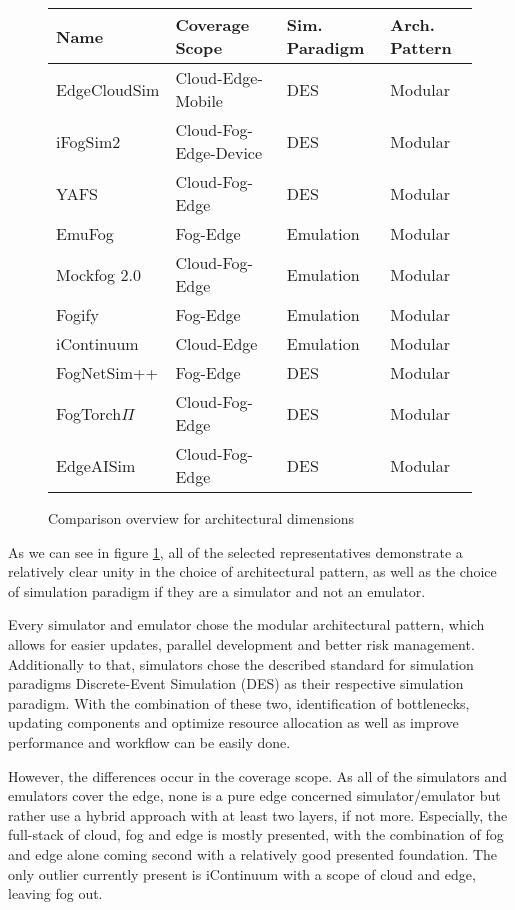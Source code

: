 \begin{figure}[H]
  \centering
  \begin{tabularx}{\textwidth}{ l | l | l | l }
    \hline
    \textbf{Name} & \textbf{Coverage Scope} & \textbf{Sim. Paradigm} & \textbf{Arch. Pattern} \\
    \hline\hline
    EdgeCloudSim  & Cloud-Edge-Mobile     & DES       & Modular\\\hline
    iFogSim2      & Cloud-Fog-Edge-Device & DES       & Modular\\\hline
    YAFS          & Cloud-Fog-Edge        & DES       & Modular\\\hline
    EmuFog        & Fog-Edge              & Emulation & Modular\\\hline
    Mockfog 2.0   & Cloud-Fog-Edge        & Emulation & Modular\\\hline
    Fogify        & Fog-Edge              & Emulation & Modular\\\hline
    iContinuum    & Cloud-Edge            & Emulation & Modular\\\hline
    FogNetSim++   & Fog-Edge              & DES       & Modular\\\hline
    FogTorch$\Pi$ & Cloud-Fog-Edge        & DES       & Modular\\\hline
    EdgeAISim     & Cloud-Fog-Edge        & DES       & Modular\\\hline
  \end{tabularx}
  \caption{Comparison overview for architectural dimensions}
  \label{tab:analysis-architectural-dimensions}
\end{figure}

As we can see in figure \ref{tab:analysis-architectural-dimensions}, all of the selected representatives demonstrate a relatively clear unity in the choice of architectural pattern, as well as 
the choice of simulation paradigm if they are a simulator and not an emulator.

Every simulator and emulator chose the modular architectural pattern, which allows for easier updates, parallel development and better risk management.
Additionally to that, simulators chose the described standard for simulation paradigms Discrete-Event Simulation (DES) as their respective simulation paradigm.
With the combination of these two, identification of bottlenecks, updating components and optimize resource allocation as well as improve performance and workflow can be easily done.

However, the differences occur in the coverage scope.
As all of the simulators and emulators cover the edge, none is a pure edge concerned simulator/emulator but rather use a hybrid approach with at least two layers, if not more.
Especially, the full-stack of cloud, fog and edge is mostly presented, with the combination of fog and edge alone coming second with a relatively good presented foundation.
The only outlier currently present is iContinuum with a scope of cloud and edge, leaving fog out.

